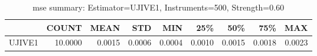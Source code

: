 \begin{table}[ht]
\centering
\caption{mse summary: Estimator=UJIVE1, Instruments=500, Strength=0.60}
\begin{tabular}{lrrrrrrrr}
\toprule
 & COUNT & MEAN & STD & MIN & 25\% & 50\% & 75\% & MAX \\
\midrule
UJIVE1 & 10.0000 & 0.0015 & 0.0006 & 0.0004 & 0.0010 & 0.0015 & 0.0018 & 0.0023 \\
\bottomrule
\end{tabular}
\end{table}
